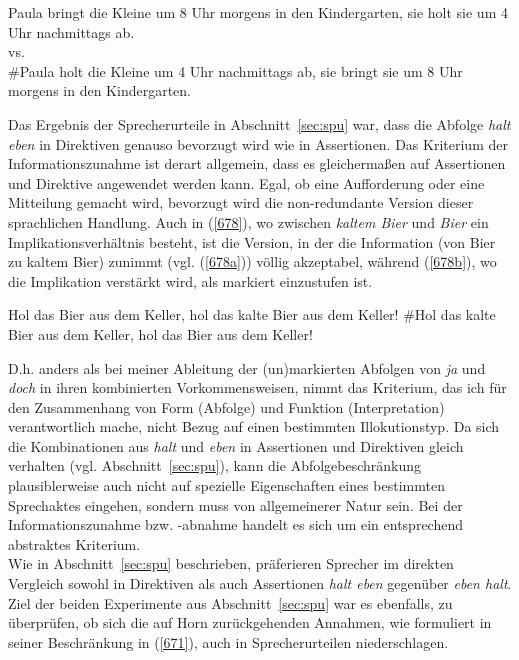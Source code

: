 \begin{exe}
	\ex\label{677} 
	Paula bringt die Kleine um 8 Uhr morgens in den Kindergarten, sie holt sie um 4 Uhr nachmittags ab.\\
	vs.\\
	\#Paula holt die Kleine um 4 Uhr nachmittags ab, sie bringt sie um 8 Uhr morgens in den Kindergarten.
\end{exe}
Das Ergebnis der Sprecherurteile in Abschnitt~\ref{sec:spu} war, dass die Abfolge \textit{halt eben} in Direktiven genauso bevorzugt wird wie in Assertionen. Das Kriterium der Informationszunahme ist derart allgemein, dass es gleichermaßen auf Assertionen und Direktive angewendet werden kann. Egal, ob eine Aufforderung oder eine Mitteilung gemacht wird, bevorzugt wird die non-redundante Version dieser sprachlichen Handlung. Auch in (\ref{678}), wo zwischen \textit{kaltem Bier} und \textit{Bier} ein Implikationsverhältnis besteht, ist die Version, in der die Information (von Bier zu kaltem Bier) zunimmt (vgl. (\ref{678a})) völlig akzeptabel, während (\ref{678b}), wo die Implikation verstärkt wird, als markiert einzustufen ist.
	
\begin{exe}
	\ex\label{678} 
		\begin{xlist}	
			\ex\label{678a} Hol das Bier aus dem Keller, hol das kalte Bier aus dem Keller!
			\ex\label{678b} \#Hol das kalte Bier aus dem Keller, hol das Bier aus dem Keller!
		\end{xlist}
\end{exe}
D.h. anders als bei meiner Ableitung der (un)markierten Abfolgen von \textit{ja} und \textit{doch} in ihren kombinierten Vorkommensweisen, nimmt das Kriterium, das ich für den Zusammenhang  von Form (Abfolge) und Funktion (Interpretation) verantwortlich mache, nicht Bezug auf einen bestimmten Illokutionstyp. Da sich die Kombinationen aus \textit{halt} und \textit{eben} in Assertionen und Direktiven gleich verhalten (vgl. Abschnitt~\ref{sec:spu}), kann die Abfolgebeschränkung plausiblerweise auch nicht auf spezielle Eigenschaften eines bestimmten Sprechaktes eingehen, sondern muss von allgemeinerer Natur sein. Bei der Informationszunahme bzw. -abnahme  handelt es sich um ein entsprechend abstraktes Kriterium.\\

\noindent
Wie in Abschnitt~\ref{sec:spu} beschrieben, präferieren Sprecher im direkten Vergleich sowohl in Direktiven als auch Assertionen \textit{halt eben} gegenüber \textit{eben halt}. Ziel der beiden Experimente aus Abschnitt~\ref{sec:spu} war es ebenfalls, zu überprüfen, ob sich die auf Horn zurückgehenden Annahmen, wie formuliert in seiner Beschränkung in (\ref{671}), auch in Sprecherurteilen niederschlagen. 

